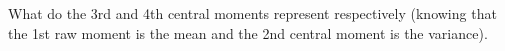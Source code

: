What do the 3rd and 4th central moments represent respectively (knowing that the 1st raw moment is the mean and the 2nd central moment is the variance).

\smallspace


